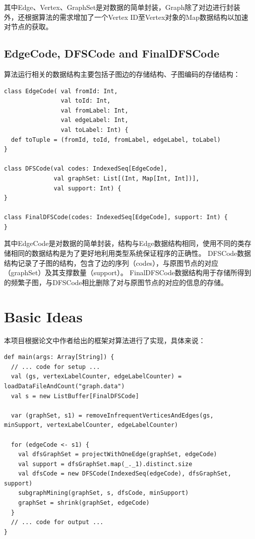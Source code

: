 \documentclass{article}
\begin{document}
其中Edge、Vertex、GraphSet是对数据的简单封装，Graph除了对边进行封装外，还根据算法的需求增加了一个Vertex ID至Vertex对象的Map数据结构以加速对节点的获取。



\subsection{EdgeCode, DFSCode and FinalDFSCode}

算法运行相关的数据结构主要包括子图边的存储结构、子图编码的存储结构：

\begin{lstlisting}[style=mStyle]
class EdgeCode( val fromId: Int, 
                val toId: Int, 
                val fromLabel: Int, 
                val edgeLabel: Int, 
                val toLabel: Int) {
  def toTuple = (fromId, toId, fromLabel, edgeLabel, toLabel)
}

class DFSCode(val codes: IndexedSeq[EdgeCode], 
              val graphSet: List[(Int, Map[Int, Int])], 
              val support: Int) {
}

class FinalDFSCode(codes: IndexedSeq[EdgeCode], support: Int) {
}

\end{lstlisting}

其中EdgeCode是对数据的简单封装，结构与Edge数据结构相同，使用不同的类存储相同的数据结构是为了更好地利用类型系统保证程序的正确性。
DFSCode数据结构记录了子图的结构，包含了边的序列（codes），与原图节点的对应（graphSet）及其支撑数量（support）。
FinalDFSCode数据结构用于存储所得到的频繁子图，与DFSCode相比删除了对与原图节点的对应的信息的存储。

\section{Basic Ideas}
本项目根据论文中作者给出的框架对算法进行了实现，具体来说：

\begin{lstlisting}[style=mStyle]
def main(args: Array[String]) {
  // ... code for setup ...
  val (gs, vertexLabelCounter, edgeLabelCounter) = loadDataFileAndCount("graph.data")
  val s = new ListBuffer[FinalDFSCode]

  var (graphSet, s1) = removeInfrequentVerticesAndEdges(gs, minSupport, vertexLabelCounter, edgeLabelCounter)

  for (edgeCode <- s1) {
    val dfsGraphSet = projectWithOneEdge(graphSet, edgeCode)
    val support = dfsGraphSet.map(_._1).distinct.size
    val dfsCode = new DFSCode(IndexedSeq(edgeCode), dfsGraphSet, support)
    subgraphMining(graphSet, s, dfsCode, minSupport)
    graphSet = shrink(graphSet, edgeCode)
  }
  // ... code for output ...
}
\end{lstlisting}
\end{document}
